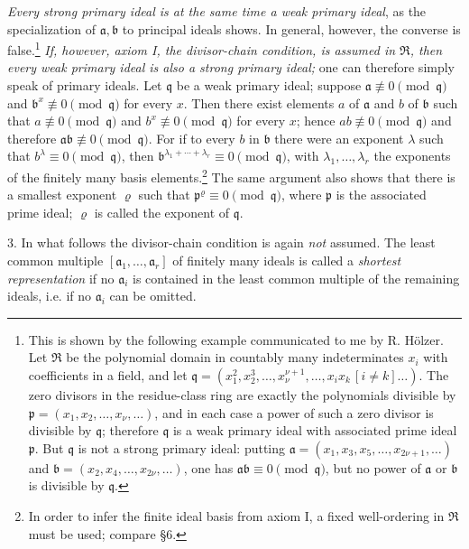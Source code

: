 \documentclass[11pt]{article}
\providecommand{\mR}{\mathfrak{R}}
\providecommand{\ma}{\mathfrak{a}}
\providecommand{\mb}{\mathfrak{b}}
\providecommand{\mpideal}{\mathfrak{p}}
\providecommand{\mq}{\mathfrak{q}}
\begin{document}
\emph{Every strong primary ideal is at the same time a weak primary ideal}, as the specialization of $\ma,\mb$ to principal ideals shows. In general, however, the converse is false.\footnote{This is shown by the following example communicated to me by R. Hölzer. Let $\mR$ be the polynomial domain in countably many indeterminates $x_i$ with coefficients in a field, and let $\mq=(x_1^2,x_2^3,\ldots,x_\nu^{\nu+1},\ldots,x_i x_k\,[i\ne k]\ldots)$. The zero divisors in the residue-class ring are exactly the polynomials divisible by $\mpideal=(x_1,x_2,\ldots,x_\nu,\ldots)$, and in each case a power of such a zero divisor is divisible by $\mq$; therefore $\mq$ is a weak primary ideal with associated prime ideal $\mpideal$. But $\mq$ is not a strong primary ideal: putting $\ma=(x_1,x_3,x_5,\ldots,x_{2\nu+1},\ldots)$ and $\mb=(x_2,x_4,\ldots,x_{2\nu},\ldots)$, one has $\ma\mb\equiv0\pmod{\mq}$, but no power of $\ma$ or $\mb$ is divisible by $\mq$.} \emph{If, however, axiom I, the divisor-chain condition, is assumed in $\mR$, then every weak primary ideal is also a strong primary ideal;} one can therefore simply speak of primary ideals. Let $\mq$ be a weak primary ideal; suppose $\ma\not\equiv0\pmod{\mq}$ and $\mb^x\not\equiv0\pmod{\mq}$ for every $x$. Then there exist elements $a$ of $\ma$ and $b$ of $\mb$ such that $a\not\equiv0\pmod{\mq}$ and $b^x\not\equiv0\pmod{\mq}$ for every $x$; hence $ab\not\equiv0\pmod{\mq}$ and therefore $\ma\mb\not\equiv0\pmod{\mq}$. For if to every $b$ in $\mb$ there were an exponent $\lambda$ such that $b^\lambda\equiv0\pmod{\mq}$, then $\mb^{\lambda_1+\cdots+\lambda_r}\equiv0\pmod{\mq}$, with $\lambda_1,\ldots,\lambda_r$ the exponents of the finitely many basis elements.\footnote{In order to infer the finite ideal basis from axiom I, a fixed well-ordering in $\mR$ must be used; compare §6.} The same argument also shows that there is a smallest exponent $\varrho$ such that $\mpideal^\varrho\equiv0\pmod{\mq}$, where $\mpideal$ is the associated prime ideal; $\varrho$ is called the exponent of $\mq$.

3. In what follows the divisor-chain condition is again \emph{not} assumed. The least common multiple $[\ma_1,
\ldots,\ma_r]$ of finitely many ideals is called a \emph{shortest representation} if no $\ma_i$ is contained in the least common multiple of the remaining ideals, i.e. if no $\ma_i$ can be omitted.
\end{document}
